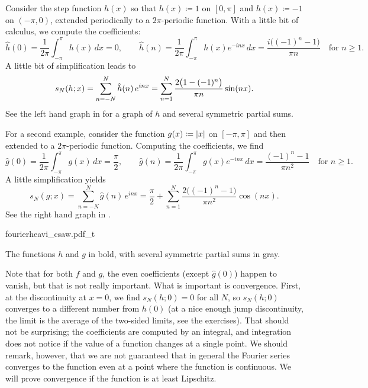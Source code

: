 \begin{example}
Consider the step function $h(x)$ so that $h(x) \coloneqq 1$
on $[0,\pi]$ and $h(x) \coloneqq -1$ on $(-\pi,0)$, extended periodically to a
$2\pi$-periodic function.  With a little bit of calculus,
we compute the coefficients:
\begin{equation*}
\hat{h}(0) = \frac{1}{2\pi} \int_{-\pi}^\pi h(x) \, dx = 0,
\qquad
\hat{h}(n) = \frac{1}{2\pi} \int_{-\pi}^\pi h(x) e^{-inx} \, dx = \frac{i\bigl(
(-1)^n-1 \bigr)}{\pi n} \quad \text{for } n \geq 1 .
\end{equation*}
A little bit of simplification leads to
\begin{equation*}
s_N(h;x) =
\sum_{n=-N}^N \hat{h}(n) \,e^{inx} 
=
\sum_{n=1}^N \frac{2\bigl(1-(-1)^n\bigr)}{\pi n} \sin(n x) .
\avoidbreak
\end{equation*}
See the left hand graph in 
for a graph of $h$ and several symmetric partial sums.

For a second example, consider the function $g(x) \coloneqq \lvert {x} \rvert$
on $[-\pi,\pi]$ and then extended to a $2\pi$-periodic function.
Computing the coefficients, we find
\begin{equation*}
\hat{g}(0) = \frac{1}{2\pi} \int_{-\pi}^\pi g(x) \, dx = \frac{\pi}{2},
\qquad
\hat{g}(n) = \frac{1}{2\pi} \int_{-\pi}^\pi g(x) e^{-inx} \, dx
= \frac{(-1)^n-1}{\pi n^2} \quad \text{for } n \geq 1 .
\end{equation*}
A little simplification yields
\begin{equation*}
s_N(g;x) =
\sum_{n=-N}^N \hat{g}(n) \,e^{inx} 
=
\frac{\pi}{2} + 
\sum_{n=1}^N \frac{2\bigl((-1)^n-1\bigr)}{\pi n^2} \cos(n x) .
\end{equation*}
See the right hand graph in .

\begin{myfigureht}
{fourierheavi_csaw.pdf_t}
\caption{The functions $h$ and $g$ in bold, with several
symmetric partial sums in gray.\label{fig:fourierheavicsaw}}
\end{myfigureht}

Note that for both $f$ and $g$, the even coefficients (except $\hat{g}(0)$)
happen to vanish, but that is not really important.
What is important is convergence.
First, at the discontinuity at $x=0$, we find $s_N(h;0) = 0$
for all $N$, so $s_N(h;0)$ converges
to a different number from $h(0)$ (at a nice enough jump discontinuity, the
limit is the average of the two-sided limits, see the exercises).
That should not be surprising;
the coefficients are computed by an integral, and integration
does not notice if the value of a function changes at a single point.
We should remark, however, that we are not guaranteed that in general
the Fourier series converges to the function even at a point where
the function is continuous.
We will prove convergence if the function is at least Lipschitz.


\end{example}
